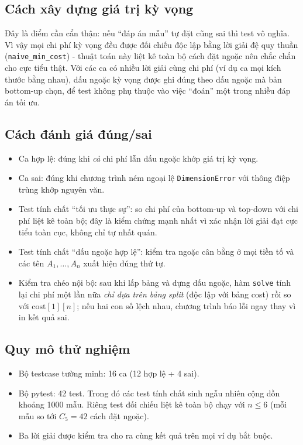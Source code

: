 \documentclass[12pt,a4paper]{article}
\begin{document}
\subsection{Cách xây dựng giá trị kỳ vọng}
Đây là điểm cần cẩn thận: nếu \enquote{đáp án mẫu} tự đặt cũng sai thì test vô nghĩa. Vì vậy mọi chi phí kỳ vọng đều được đối chiếu độc lập bằng lời giải đệ quy thuần (\texttt{naive\_min\_cost}) - thuật toán này liệt kê toàn bộ cách đặt ngoặc nên chắc chắn cho cực tiểu thật. Với các ca có nhiều lời giải cùng chi phí (ví dụ ca mọi kích thước bằng nhau), dấu ngoặc kỳ vọng được ghi đúng theo dấu ngoặc mà bản bottom-up chọn, để test không phụ thuộc vào việc \enquote{đoán} một trong nhiều đáp án tối ưu.

\subsection{Cách đánh giá đúng/sai}
\begin{itemize}
  \item Ca hợp lệ: đúng khi \emph{cả} chi phí lẫn dấu ngoặc khớp giá trị kỳ vọng.
  \item Ca sai: đúng khi chương trình ném ngoại lệ \texttt{DimensionError} với thông điệp trùng khớp nguyên văn.
  \item Test tính chất \enquote{tối ưu thực sự}: so chi phí của bottom-up và top-down với chi phí liệt kê toàn bộ; đây là kiểm chứng mạnh nhất vì xác nhận lời giải đạt cực tiểu toàn cục, không chỉ tự nhất quán.
  \item Test tính chất \enquote{dấu ngoặc hợp lệ}: kiểm tra ngoặc cân bằng ở mọi tiền tố và các tên $A_1, \ldots, A_n$ xuất hiện đúng thứ tự.
  \item Kiểm tra chéo nội bộ: sau khi lấp bảng và dựng dấu ngoặc, hàm \texttt{solve} tính lại chi phí một lần nữa \emph{chỉ dựa trên bảng split} (độc lập với bảng cost) rồi so với $\mathrm{cost}[1][n]$; nếu hai con số lệch nhau, chương trình báo lỗi ngay thay vì in kết quả sai.
\end{itemize}

\subsection{Quy mô thử nghiệm}
\begin{itemize}
  \item Bộ testcase tường minh: 16 ca (12 hợp lệ + 4 sai).
  \item Bộ pytest: 42 test. Trong đó các test tính chất sinh ngẫu nhiên cộng dồn khoảng 1000 mẫu. Riêng test đối chiếu liệt kê toàn bộ chạy với $n \le 6$ (mỗi mẫu so tới $C_5 = 42$ cách đặt ngoặc).
  \item Ba lời giải được kiểm tra cho ra cùng kết quả trên mọi ví dụ bắt buộc.
\end{itemize}
\end{document}
